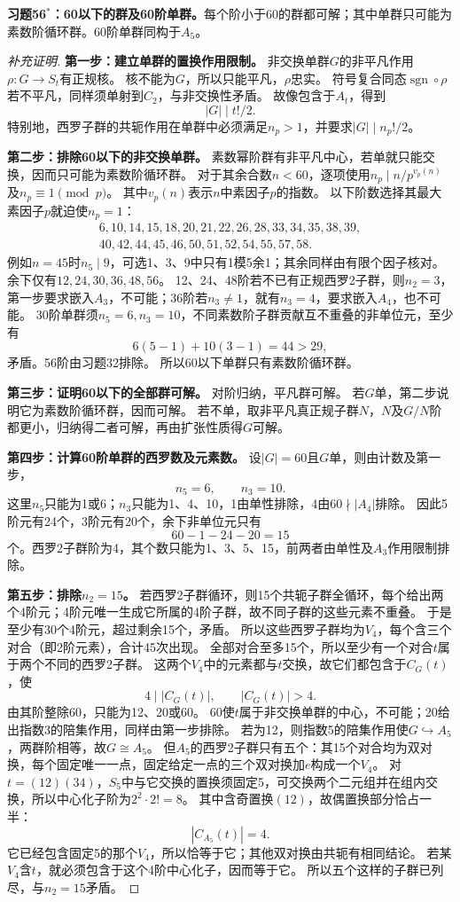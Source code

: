 \begin{problem}
\textbf{习题56$^*$：60以下的群及60阶单群。}每个阶小于60的群都可解；其中单群只可能为素数阶循环群。60阶单群同构于$A_5$。
\end{problem}
\begin{proof}[补充证明]
\textbf{第一步：建立单群的置换作用限制。}
非交换单群$G$的非平凡作用$\rho:G\to S_t$有正规核。
核不能为$G$，所以只能平凡，$\rho$忠实。
符号复合同态$\operatorname{sgn}\circ\rho$若不平凡，同样须单射到$C_2$，与非交换性矛盾。
故像包含于$A_t$，得到
\[
|G|\mid t!/2.
\]
特别地，西罗子群的共轭作用在单群中必须满足$n_p>1$，并要求$|G|\mid n_p!/2$。

\textbf{第二步：排除60以下的非交换单群。}
素数幂阶群有非平凡中心，若单就只能交换，因而只可能为素数阶循环群。
对于其余合数$n<60$，逐项使用$n_p\mid n/p^{v_p(n)}$及$n_p\equiv1\pmod p$。
其中$v_p(n)$表示$n$中素因子$p$的指数。
以下阶数选择其最大素因子$p$就迫使$n_p=1$：
\[
\begin{gathered}
6,10,14,15,18,20,21,22,26,28,33,34,35,38,39,\\
40,42,44,45,46,50,51,52,54,55,57,58.
\end{gathered}
\]
例如$n=45$时$n_5\mid9$，可选1、3、9中只有1模5余1；其余同样由有限个因子核对。
余下仅有$12,24,30,36,48,56$。
12、24、48阶若不已有正规西罗2子群，则$n_2=3$，第一步要求嵌入$A_3$，不可能；36阶若$n_3\neq1$，就有$n_3=4$，要求嵌入$A_4$，也不可能。
30阶单群须$n_5=6,n_3=10$，不同素数阶子群贡献互不重叠的非单位元，至少有
\[
6(5-1)+10(3-1)=44>29,
\]
矛盾。56阶由习题32排除。
所以60以下单群只有素数阶循环群。

\textbf{第三步：证明60以下的全部群可解。}
对阶归纳，平凡群可解。
若$G$单，第二步说明它为素数阶循环群，因而可解。
若不单，取非平凡真正规子群$N$，$N$及$G/N$阶都更小，归纳得二者可解，再由扩张性质得$G$可解。

\textbf{第四步：计算60阶单群的西罗数及元素数。}
设$|G|=60$且$G$单，则由计数及第一步，
\[
n_5=6,\qquad n_3=10.
\]
这里$n_5$只能为1或6；$n_3$只能为1、4、10，1由单性排除，4由$60\nmid|A_4|$排除。
因此5阶元有24个，3阶元有20个，余下非单位元只有
\[
60-1-24-20=15
\]
个。西罗2子群阶为4，其个数只能为1、3、5、15，前两者由单性及$A_3$作用限制排除。

\textbf{第五步：排除$n_2=15$。}
若西罗2子群循环，则15个共轭子群全循环，每个给出两个4阶元；4阶元唯一生成它所属的4阶子群，故不同子群的这些元素不重叠。
于是至少有30个4阶元，超过剩余15个，矛盾。
所以这些西罗子群均为$V_4$，每个含三个对合（即2阶元素），合计45次出现。
全部对合至多15个，所以至少有一个对合$t$属于两个不同的西罗2子群。
这两个$V_4$中的元素都与$t$交换，故它们都包含于$C_G(t)$，使
\[
4\mid|C_G(t)|,\qquad|C_G(t)|>4.
\]
由其阶整除60，只能为12、20或60。
60使$t$属于非交换单群的中心，不可能；20给出指数3的陪集作用，同样由第一步排除。
若为12，则指数5的陪集作用使$G\hookrightarrow A_5$，两群阶相等，故$G\cong A_5$。
但$A_5$的西罗2子群只有五个：其15个对合均为双对换，每个固定唯一一点，固定给定一点的三个双对换加$e$构成一个$V_4$。
对$t=(12)(34)$，$S_5$中与它交换的置换须固定5，可交换两个二元组并在组内交换，所以中心化子阶为$2^2\cdot2!=8$。
其中含奇置换$(12)$，故偶置换部分恰占一半：
\[
|C_{A_5}(t)|=4.
\]
它已经包含固定5的那个$V_4$，所以恰等于它；其他双对换由共轭有相同结论。
若某$V_4$含$t$，就必须包含于这个4阶中心化子，因而等于它。
所以五个这样的子群已列尽，与$n_2=15$矛盾。


\end{proof}
